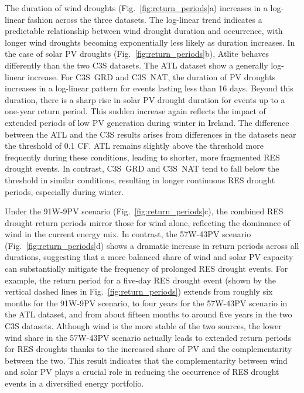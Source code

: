\documentclass[preprint, 12pt]{elsarticle}
\begin{document}
The duration of wind droughts (Fig.~\ref{fig:return_periods}a) increases in a log-linear fashion across the three datasets. The log-linear trend indicates a predictable relationship between wind drought duration and occurrence, with longer wind droughts becoming exponentially less likely as duration increases. In the case of solar PV droughts (Fig.~\ref{fig:return_periods}b), Atlite behaves differently than the two C3S datasets. The ATL dataset show a generally log-linear increase. For C3S~GRD and C3S~NAT, the duration of PV droughts increases in a log-linear pattern for events lasting less than 16 days. Beyond this duration, there is a sharp rise in solar PV drought duration for events up to a one-year return period. This sudden increase again reflects the impact of extended periods of low PV generation during winter in Ireland. The difference between the ATL and the C3S results arises from differences in the datasets near the threshold of 0.1 CF. ATL remains slightly above the threshold more frequently during these conditions, leading to shorter, more fragmented RES drought events. In contrast, C3S~GRD and C3S~NAT tend to fall below the threshold in similar conditions, resulting in longer continuous RES drought periods, especially during winter.

Under the 91W-9PV scenario (Fig.~\ref{fig:return_periods}c), the combined RES drought return periods mirror those for wind alone, reflecting the dominance of wind in the current energy mix. In contrast, the 57W-43PV scenario (Fig.~\ref{fig:return_periods}d) shows a dramatic increase in return periods across all durations, suggesting that a more balanced share of wind and solar PV capacity can substantially mitigate the frequency of prolonged RES drought events. For example, the return period for a five-day RES drought event (shown by the vertical dashed lines in Fig.~\ref{fig:return_periods}) extends from roughly six months for the 91W-9PV scenario, to four years for the 57W-43PV scenario in the ATL dataset, and from about fifteen months to around five years in the two C3S datasets. Although wind is the more stable of the two sources, the lower wind share in the 57W-43PV scenario actually leads to extended return periods for RES droughts thanks to the increased share of PV and the complementarity between the two. This result indicates that the complementarity between wind and solar PV plays a crucial role in reducing the occurrence of RES drought events in a diversified energy portfolio.
\end{document}
